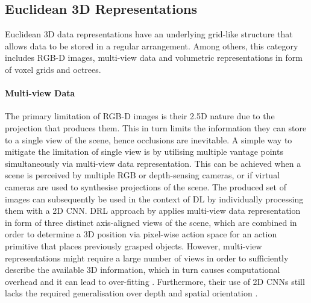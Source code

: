 \subsection{Euclidean 3D Representations}

Euclidean 3D data representations have an underlying grid-like structure that allows data to be stored in a regular arrangement. Among others, this category includes RGB-D images, multi-view data and volumetric representations in form of voxel grids and octrees.


\paragraph{Multi-view Data} The primary limitation of RGB-D images is their 2.5D nature due to the projection that produces them. This in turn limits the information they can store to a single view of the scene, hence occlusions are inevitable. A simple way to mitigate the limitation of single view is by utilising multiple vantage points simultaneously via multi-view data representation. This can be achieved when a scene is perceived by multiple RGB or depth-sensing cameras, or if virtual cameras are used to synthesise projections of the scene. The produced set of images can subsequently be used in the context of DL by individually processing them with a 2D CNN. DRL approach by \citet{gualtieri_learning_2018} applies multi-view data representation in form of three distinct axis-aligned views of the scene, which are combined in order to determine a 3D position via pixel-wise action space for an action primitive that places previously grasped objects. However, multi-view representations might require a large number of views in order to sufficiently describe the available 3D information, which in turn causes computational overhead and it can lead to over-fitting \cite{ahmed_deep_2018}. Furthermore, their use of 2D CNNs still lacks the required generalisation over depth and spatial orientation \cite{gualtieri_pick_2018}.


